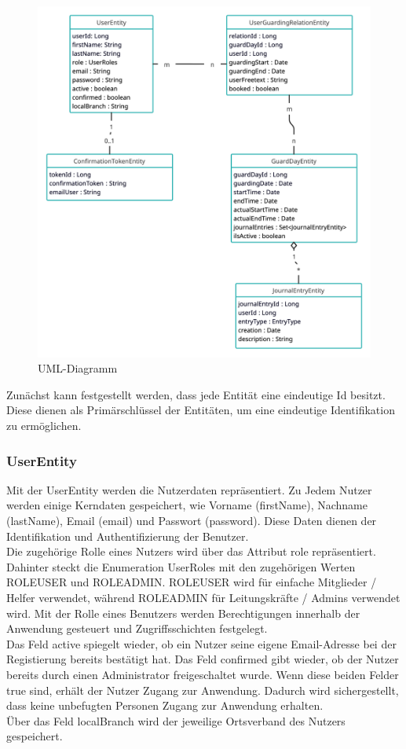 \documentclass[fontsize=12pt,openright,oneside,paper=a4,BCOR=1cm]{scrbook}
\begin{document}
\begin{figure}[H]
  \centering
  \includegraphics[width=0.6\linewidth]{Anlagen/umlDiagramm.png} 
  \caption{UML-Diagramm}
  \label{fig:anmeldeprozess}
\end{figure}

Zunächst kann festgestellt werden, dass jede Entität eine eindeutige Id besitzt. Diese dienen als Primärschlüssel der Entitäten, um eine eindeutige Identifikation zu ermöglichen.

\subsubsection{UserEntity}
Mit der \glqq UserEntity\grqq{} werden die Nutzerdaten repräsentiert. Zu Jedem Nutzer werden einige Kerndaten gespeichert, wie Vorname (\glqq firstName\grqq{}), Nachname (\glqq lastName\grqq{}), Email (\glqq email\grqq{}) und Passwort (\glqq password\grqq{}). Diese Daten dienen der Identifikation und Authentifizierung der Benutzer. \\
Die zugehörige Rolle eines Nutzers wird über das Attribut \glqq role\grqq{} repräsentiert. Dahinter steckt die Enumeration \glqq UserRoles\grqq{} mit den zugehörigen Werten \glqq ROLE\textunderscore USER\grqq{} und \glqq ROLE\textunderscore ADMIN\grqq{}. \glqq ROLE\textunderscore USER\grqq{} wird für einfache \glqq Mitglieder / Helfer\grqq{} verwendet, während \glqq ROLE\textunderscore ADMIN\grqq{} für \glqq Leitungskräfte / Admins\grqq{} verwendet wird. Mit der Rolle eines Benutzers werden Berechtigungen innerhalb der Anwendung gesteuert und Zugriffsschichten festgelegt. \\ 
Das Feld \glqq active\grqq{} spiegelt wieder, ob ein Nutzer seine eigene Email-Adresse bei der Registierung bereits bestätigt hat. Das Feld \glqq confirmed\grqq{} gibt wieder, ob der Nutzer bereits durch einen Administrator freigeschaltet wurde. Wenn diese beiden Felder \glqq true\grqq{} sind, erhält der Nutzer Zugang zur Anwendung. Dadurch wird sichergestellt, dass keine unbefugten Personen Zugang zur Anwendung erhalten. \\
Über das Feld \glqq localBranch\grqq{} wird der jeweilige Ortsverband des Nutzers gespeichert.
\end{document}
